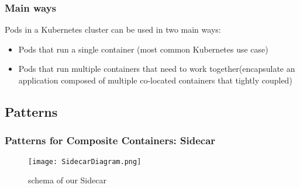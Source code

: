\begin{frame}
  \frametitle{Main ways}
  Pods in a Kubernetes cluster can be used in two main ways:
  \begin{itemize}
  \item<1->Pods that run a single container (most common Kubernetes use case)
  \item<2->Pods that run multiple containers that need to work together(encapsulate an application composed of multiple co-located containers that tightly coupled)
  \end{itemize}
\end{frame}

\subsection{Patterns}

\begin{frame}[fragile]
  \frametitle{Patterns for Composite Containers: Sidecar}
  \begin{figure}[ht]
    \caption{schema of our Sidecar}
    \centering
    \texttt{[image: SidecarDiagram.png]}
    \label{fig:SidecarDiagram}
  \end{figure}
\end{frame}
